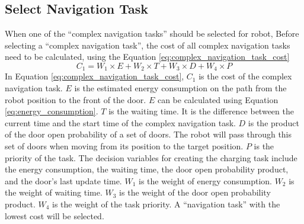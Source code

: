 \subsection{Select Navigation Task}
\label{sec:select_navigation_task}
When one of the ``complex navigation tasks'' should be selected for robot, 
Before selecting a ``complex navigation task'', the cost of  all complex navigation tasks need to be calculated, using the Equation \ref{eq:complex_navigation_task_cost}
\begin{equation}
\label{eq:complex_navigation_task_cost}
 C_{1} = W_{1} \times E + W_{2} \times T + W_{3} \times D + W_{4} \times P
 \end{equation}
In Equation \ref{eq:complex_navigation_task_cost}, $C_{1}$  is the cost of the complex navigation task. $E$ is the estimated energy consumption on the path from the robot position to the front of the door. $E$ can be calculated using Equation \ref{eq:energy_consumption}. $T$ is the waiting time. It is the difference between the current time and the start time of the complex navigation task. $D$ is the product of the door open probability of a set of doors.  The robot will pass through this set of doors when moving from its position to the target position. $P$ is the priority of the task. The decision variables for creating the charging task include the energy consumption, the waiting time,  the door open probability product, and the door's last update time. $W_{1}$ is the weight of energy consumption. $W_{2}$ is the weight of waiting time. $W_{3}$ is the weight of the door open probability product. $W_{4}$ is the weight of the task priority. A ``navigation task'' with the lowest cost will be selected.




